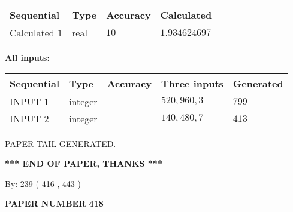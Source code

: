 \documentclass{ctexart}
\begin{document}
   
   
   
\noindent{}
   
   
  
  
\noindent\begin{tabular}{|l|l|l|l|}
\hline
 Sequential & Type & Accuracy & Calculated \\ 
\hline
 
 
  Calculated $  1 $ & real & $  10  $ & 
 $ 1.934624697 $ 
 \\  \hline  
 \end{tabular}
   
   
   
   
\noindent\vspace{0.1in}\hspace{-0.08in} {\textbf{\Large{All inputs: }}}
   
   
  
  
\noindent\begin{tabular}{|l|l|l|l|l|}
\hline
 Sequential & Type & Accuracy & Three inputs & Generated \\ 
\hline
 
 
  INPUT $  1 $ & integer &  & $
 520
 , 
 960
 , 
 3
 $ & $ 799 $ 
 \\  \hline  
 
 
  INPUT $  2 $ & integer &  & $
 140
 , 
 480
 , 
 7
 $ & $ 413 $ 
 \\  \hline  
 \end{tabular}
   
   
   
   
   
   
 \vspace{0.2in}
 
   
   
\vspace{2.0in} PAPER TAIL GENERATED.
   
   
   
   
\vspace{1.0in} 
{\textbf{\large{ *** END OF PAPER, THANKS *** }}} 
   
   
\hspace{1.0in} By: 
 239 ( 416 ,  443 )
   
   
   
   
\newpage 
\setcounter{page}{ 
   418001 } 
   
   
   
   
 {\textbf{ \Large{ PAPER NUMBER  418  }}}
   
\end{document}
